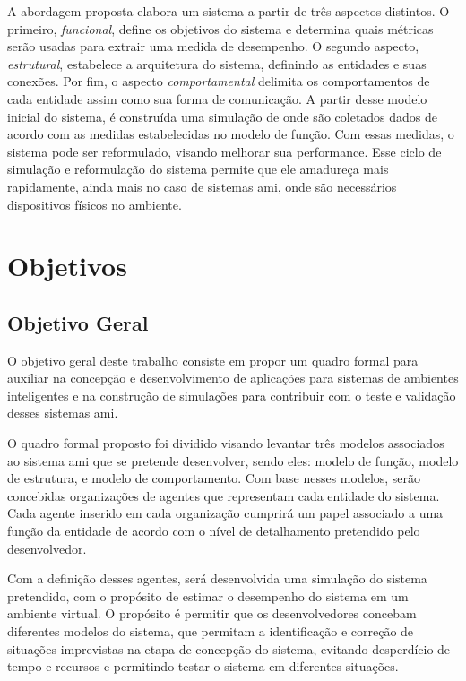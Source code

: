 A abordagem proposta elabora um sistema a partir de três aspectos distintos. O primeiro, \textit{funcional}, define os objetivos do sistema e determina quais métricas serão usadas para extrair uma medida de desempenho. O segundo aspecto, \textit{estrutural}, estabelece a arquitetura do sistema, definindo as entidades e suas conexões. Por fim, o aspecto \textit{comportamental} delimita os comportamentos de cada entidade assim como sua forma de comunicação. A partir desse modelo inicial do sistema, é construída uma simulação de onde são coletados dados de acordo com as medidas estabelecidas no modelo de função. Com essas medidas, o sistema pode ser reformulado, visando melhorar sua performance. 
Esse ciclo de simulação e reformulação do sistema permite que ele amadureça mais rapidamente, ainda mais no caso de sistemas \acrshort{ami}, onde são necessários dispositivos físicos no ambiente. 
    
\section{Objetivos}
\label{sec:objetivos}


\subsection{Objetivo Geral}
\label{sec:objetivo-geral}

    O objetivo geral deste trabalho consiste em propor um quadro formal para auxiliar na concepção e desenvolvimento de aplicações para sistemas de ambientes inteligentes e na construção de simulações para contribuir com o teste e validação desses sistemas \acrshort{ami}.
    
    O quadro formal proposto foi dividido visando levantar três  modelos associados ao sistema \acrshort{ami} que se pretende desenvolver, sendo eles: modelo de função, modelo de estrutura, e modelo de comportamento. Com base nesses modelos, serão concebidas organizações de agentes que representam cada entidade do sistema. Cada agente inserido em cada organização cumprirá um papel associado a uma função da entidade de acordo com o nível de detalhamento pretendido pelo desenvolvedor. 
    
    Com a definição desses agentes, será desenvolvida uma simulação do sistema pretendido, com o propósito de estimar o desempenho do sistema em um ambiente virtual. O propósito é permitir que os desenvolvedores concebam diferentes modelos do sistema, que permitam a identificação e correção de situações imprevistas na etapa de concepção do sistema, evitando desperdício de tempo e recursos e permitindo testar o sistema em diferentes situações.  


